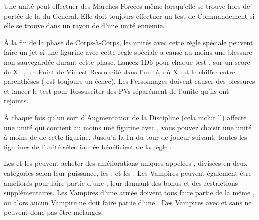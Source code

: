 
Une unité \vampiric{} peut effectuer des Marches Forcées même lorsqu'elle se trouve hors de portée de la \inspiringpresence{} du Général. Elle doit toujours effectuer un test de Commandement si elle se trouve dans un rayon de  d'une unité ennemie.

À la fin de la phase de Corps-à-Corps, les unités avec cette règle spéciale peuvent faire un jet \vampiric{} si une figurine avec cette règle spéciale a causé au moins une blessure non sauvegardée durant cette phase. Lancez 1D6 pour chaque test \vampiric{}, sur un score de X+, un Point de Vie est Ressuscité dans l'unité, où X est le chiffre entre parenthèses ( est toujours un échec). Les Personnages doivent causer des blessures et lancer le test pour Ressusciter des PVs séparément de l'unité qu'ils ont rejoints.

\armyspecialruleentry{\wakethedead}

À chaque fois qu'un sort d'Augmentation de la Discipline \necromancy{} (cela inclut l'\necromancyattribute{}) affecte une unité qui contient au moins une figurine avec \wakethedead{}, vous pouvez choisir une unité à moins de  de cette figurine. Jusqu'à la fin du tour de joueur suivant, toutes les figurines de l'unité sélectionnée bénéficient de la règle \lightningreflexes{}.

\armyspecialruleentry{\necromanticaura}



\closearmyspecialrules



Les \vampirelords{} et les \vampireheroes{} peuvent acheter des améliorations uniques appelées \bloodpowers{}, divisées en deux catégories selon leur puissance, les \bloodlinepowers{}, et les \ancientbloodpowers{}. Les Vampires peuvent également être améliorés pour faire partie d'une \bloodline{}, leur donnant des bonus et des restrictions supplémentaires. Les Vampires d'une armée doivent tous faire partie de la même \bloodline{}, ou alors aucun Vampire ne doit faire partie d'une \bloodline{}. Des Vampires avec et sans \bloodline{} ne peuvent donc pas être mélangés.

